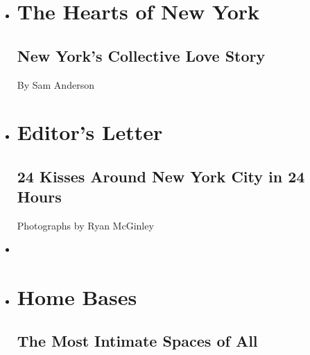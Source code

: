 \begin{itemize}
\item
  \href{https://www.nytimes3xbfgragh.onion/interactive/2018/06/06/magazine/love-city-new-york-introduction.html}{}

  \hypertarget{the-hearts-of-new-york}{%
  \section{The Hearts of New York}\label{the-hearts-of-new-york}}

  \hypertarget{new-yorks-collective-love-story}{%
  \subsection{New York's Collective Love
  Story}\label{new-yorks-collective-love-story}}

   By Sam Anderson 
\item
  \href{https://www.nytimes3xbfgragh.onion/interactive/2018/06/06/magazine/love-city-new-york-24-covers.html}{}

  \hypertarget{editors-letter}{%
  \section{Editor's Letter}\label{editors-letter}}

  \hypertarget{24-kisses-around-new-york-city-in-24-hours}{%
  \subsection{24 Kisses Around New York City in 24
  Hours}\label{24-kisses-around-new-york-city-in-24-hours}}

   Photographs by Ryan McGinley 
\item
\item
  \href{https://www.nytimes3xbfgragh.onion/interactive/2018/06/07/magazine/new-york-love-couples-in-bedrooms.html}{}

  \hypertarget{home-bases}{%
  \section{Home Bases}\label{home-bases}}

  \hypertarget{the-most-intimate-spaces-of-all}{%
  \subsection{The Most Intimate Spaces of
  All}\label{the-most-intimate-spaces-of-all}}


\end{itemize}
